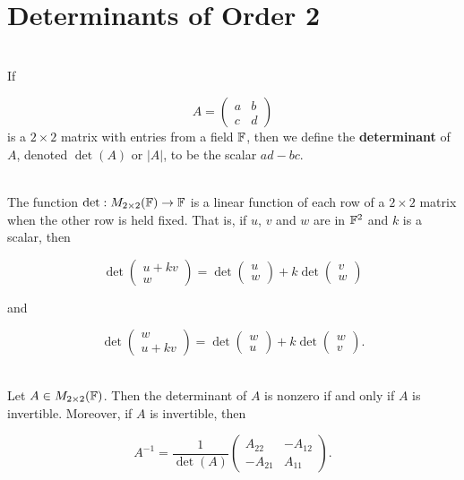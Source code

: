 \section{Determinants of Order 2}

\begin{definition}
	\hfill\\
	If

	\[A = \begin{pmatrix}
			a & b \\
			c & d
		\end{pmatrix}\]
	is a $2 \times 2$ matrix with entries from a field $\mathbb{F}$, then we define the \textbf{determinant} of $A$, denoted $\det(A)$ or $|A|$, to be the scalar $ad-bc$.
\end{definition}

\begin{theorem}
	\hfill\\
	The function $\det: M_{2 \times 2}(\mathbb{F}) \to \mathbb{F}$ is a linear function of each row of a $2 \times 2$ matrix when the other row is held fixed. That is, if $u$, $v$ and $w$ are in $\mathbb{F}^2$ and $k$ is a scalar, then

	\[\det \begin{pmatrix}
			u + kv \\
			w
		\end{pmatrix} = \det\begin{pmatrix}
			u \\ w
		\end{pmatrix} + k\det\begin{pmatrix}
			v \\ w
		\end{pmatrix}\]

	and

	\[\det\begin{pmatrix}
			w \\ u + kv
		\end{pmatrix} = \det\begin{pmatrix}
			w \\ u
		\end{pmatrix} + k \det \begin{pmatrix}
			w \\ v
		\end{pmatrix}.\]
\end{theorem}

\begin{theorem}\label{Theorem 4.2}
	\hfill\\
	Let $A \in M_{2 \times 2}(\mathbb{F})$. Then the determinant of $A$ is nonzero if and only if $A$ is invertible. Moreover, if $A$ is invertible, then

	\[A^{-1} = \frac{1}{\det(A)}\begin{pmatrix}
			A_{22}  & -A_{12} \\
			-A_{21} & A_{11}
		\end{pmatrix}.\]
\end{theorem}

